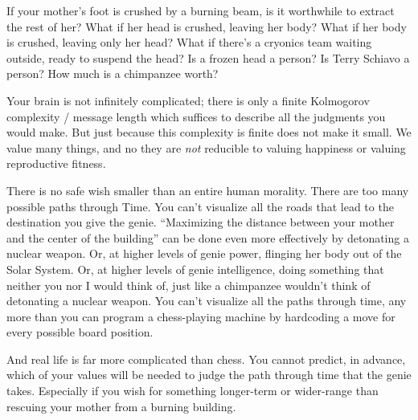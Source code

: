  If your mother's foot is crushed by a burning
beam, is it worthwhile to extract the rest of her? What if her head is
crushed, leaving her body? What if her body is crushed, leaving only
her head? What if there's a cryonics team waiting
outside, ready to suspend the head? Is a frozen head a person? Is Terry
Schiavo a person? How much is a chimpanzee worth?


 Your brain is not infinitely complicated; there is only a finite
Kolmogorov complexity / message length which suffices to describe all
the judgments you would make. But just because this complexity is
finite does not make it small. We value many things, and no they are
\textit{not} reducible to valuing happiness or valuing reproductive
fitness.


 There is no safe wish smaller than an entire human morality. There
are too many possible paths through Time. You can't
visualize all the roads that lead to the destination you give the
genie. ``Maximizing the distance between your mother
and the center of the building'' can be done even
more effectively by detonating a nuclear weapon. Or, at higher levels
of genie power, flinging her body out of the Solar System. Or, at
higher levels of genie intelligence, doing something that neither you
nor I would think of, just like a chimpanzee wouldn't
think of detonating a nuclear weapon. You can't
visualize all the paths through time, any more than you can program a
chess-playing machine by hardcoding a move for every possible board
position.


 And real life is far more complicated than chess. You cannot
predict, in advance, which of your values will be needed to judge the
path through time that the genie takes. Especially if you wish for
something longer-term or wider-range than rescuing your mother from a
burning building.

